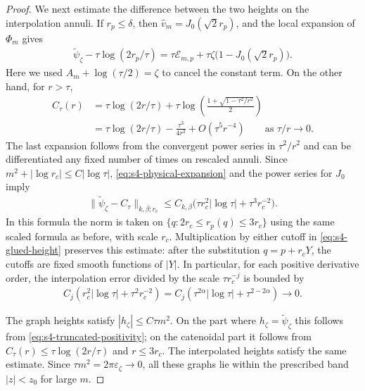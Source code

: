\documentclass[a4paper,11pt,oneside,reqno]{amsart}
\numberwithin{equation}{section}
\theoremstyle{definition}
\begin{document}
\begin{proof}
    We next estimate the difference between the two heights
    on the interpolation annuli. If $r_p\leq\delta$,
    then $\widehat v_m=J_0(\sqrt2r_p)$, and the local
    expansion of $\Phi_m$ gives
    \begin{align*}
        \widetilde\psi_\zeta
        -\tau\log(2r_p/\tau)
        =\tau\mathcal E_{m,p}
         +\tau\zeta\bigl(1-J_0(\sqrt2r_p)\bigr).
    \end{align*}
    Here we used
    $A_m+\log(\tau/2)=\zeta$ to cancel the constant
    term. On the other hand, for $r>\tau$,
    \begin{align*}
        C_\tau(r)
        &=\tau\log(2r/\tau)
          +\tau\log\left(
                \frac{1+\sqrt{1-\tau^2/r^2}}2\right)\\
        &=\tau\log(2r/\tau)
          -\frac{\tau^3}{4r^2}+O(\tau^5r^{-4})
          \qquad\text{as }\tau/r\to0.
    \end{align*}
    The last expansion follows from the convergent power
    series in $\tau^2/r^2$ and can be differentiated any
    fixed number of times on rescaled annuli. Since
    $m^2+|\log r_c|\leq C|\log\tau|$,
    \eqref{eq:s4-physical-expansion} and the power series
    for $J_0$ imply
    \begin{align}
        \label{eq:s4-matching-estimate}
        \|\widetilde\psi_\zeta-C_\tau\|_{k,\beta;r_c}
        \leq C_{k,\beta}
        \bigl(\tau r_c^2|\log\tau|
                   +\tau^3r_c^{-2}\bigr).
    \end{align}
    In this formula the norm is taken on
    $\{q:2r_c\leq r_p(q)\leq3r_c\}$ using the same
    scaled formula as before, with scale $r_c$.
    Multiplication by either cutoff in
    \eqref{eq:s4-glued-height} preserves this estimate:
    after the substitution $q=p+r_cY$, the cutoffs are
    fixed smooth functions of $|Y|$. In particular, for
    each positive derivative order, the interpolation
    error divided by the scale $\tau r_c^{-j}$ is bounded by
    \begin{align*}
        C_j\left(r_c^2|\log\tau|+\tau^2r_c^{-2}\right)
        =C_j\left(\tau^{2\alpha}|\log\tau|
                        +\tau^{2-2\alpha}\right)
        \rightarrow0.
    \end{align*}

    The graph heights satisfy $|h_\zeta|\leq C\tau m^2$.
    On the part where $h_\zeta=\widetilde\psi_\zeta$ this
    follows from \eqref{eq:s4-truncated-positivity}; on
    the catenoidal part it follows from
    $C_\tau(r)\leq\tau\log(2r/\tau)$ and
    $r\leq3r_c$. The interpolated heights satisfy the same
    estimate. Since $\tau m^2=2\pi\varepsilon_\zeta\to0$,
    all these graphs lie within the prescribed band
    $|z|<z_0$ for large $m$.


\end{proof}
\end{document}
